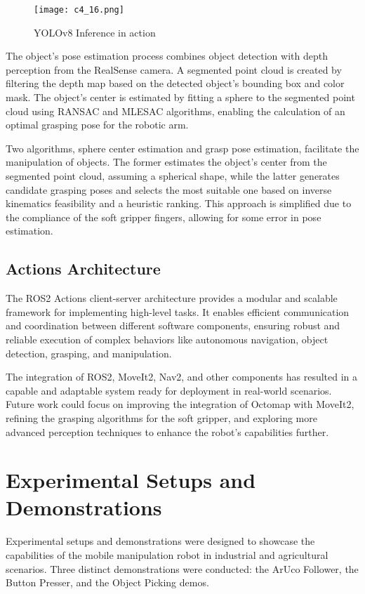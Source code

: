 \begin{figure}[t]
    \centering
    \texttt{[image: c4\_16.png]}
    \caption{YOLOv8 Inference in action}
    \label{fig:yolov8}
\end{figure}

The object's pose estimation process combines object detection with depth perception from the RealSense camera.
A segmented point cloud is created by filtering the depth map based on the detected object's bounding box and color mask.
The object's center is estimated by fitting a sphere to the segmented point cloud using RANSAC and MLESAC algorithms,
enabling the calculation of an optimal grasping pose for the robotic arm.

Two algorithms, sphere center estimation and grasp pose estimation, facilitate the manipulation of objects. The former estimates the object's center from the segmented point cloud, assuming a spherical shape, 
while the latter generates candidate grasping poses and selects the most suitable one based on inverse kinematics 
feasibility and a heuristic ranking. This approach is simplified due to the compliance of the soft gripper fingers, 
allowing for some error in pose estimation.

\subsection{Actions Architecture}

The ROS2 Actions client-server architecture provides a modular and scalable framework for implementing high-level tasks.
It enables efficient communication and coordination between different software components, 
ensuring robust and reliable execution of complex behaviors like autonomous navigation, object detection, grasping,
and manipulation.

The integration of ROS2, MoveIt2, Nav2, and other components 
has resulted in a capable and adaptable system ready for deployment in real-world scenarios. Future work could focus
on improving the integration of Octomap with MoveIt2, refining the grasping algorithms for the soft gripper, 
and exploring more advanced perception techniques to enhance the robot's capabilities further.

\section{Experimental Setups and Demonstrations}

Experimental setups and demonstrations were designed to showcase the capabilities of the 
mobile manipulation robot in industrial and agricultural scenarios. Three distinct demonstrations were conducted:
the ArUco Follower, the Button Presser, and the Object Picking demos.


